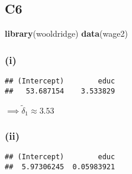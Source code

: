 \documentclass[
]{article}
\newenvironment{Shaded}{\begin{snugshade}}{\end{snugshade}}
\newcommand{\DataTypeTok}[1]{\textcolor[rgb]{0.13,0.29,0.53}{#1}}
\newcommand{\KeywordTok}[1]{\textcolor[rgb]{0.13,0.29,0.53}{\textbf{#1}}}
\newcommand{\NormalTok}[1]{#1}
\newcommand{\OperatorTok}[1]{\textcolor[rgb]{0.81,0.36,0.00}{\textbf{#1}}}
\newcommand{\StringTok}[1]{\textcolor[rgb]{0.31,0.60,0.02}{#1}}
\begin{document}
\hypertarget{c6}{%
\subsection{C6}\label{c6}}

\begin{Shaded}
\begin{Highlighting}[]
\KeywordTok{library}\NormalTok{(wooldridge)}
\KeywordTok{data}\NormalTok{(wage2)}
\end{Highlighting}
\end{Shaded}

\hypertarget{i}{%
\subsubsection{(i)}\label{i}}

\begin{Shaded}
\end{Shaded}

\begin{verbatim}
## (Intercept)        educ 
##   53.687154    3.533829
\end{verbatim}

\(\implies \tilde\delta_1 \approx 3.53\)

\hypertarget{ii}{%
\subsubsection{(ii)}\label{ii}}

\begin{Shaded}
\end{Shaded}

\begin{verbatim}
## (Intercept)        educ 
##  5.97306245  0.05983921
\end{verbatim}
\end{document}

